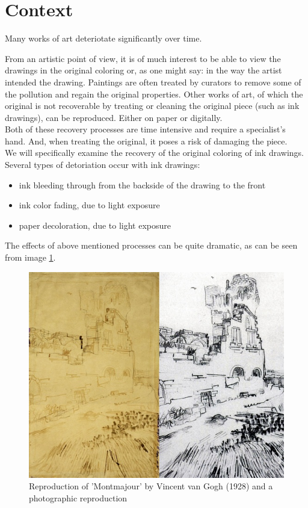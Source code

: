 \section{Context}

	Many works of art deteriotate significantly over time.

	From an artistic point of view, it is of much interest to be able to view the drawings
	in the original coloring or, as one might say: in the way the artist intended the drawing.
	Paintings are often treated by curators to remove some of the pollution and regain
	the original properties.  Other works of art, of which the original is not recoverable by
	treating or cleaning the original piece (such as ink drawings), can be reproduced.
	Either on paper or digitally. \\

	Both of these recovery processes are time intensive and require a specialist's hand.
	And, when treating the original, it poses a risk of damaging the piece. \\

	We will specifically examine the recovery of the original coloring of ink drawings.
	Several types of detoriation occur with ink drawings:

	\begin{itemize}
		\item ink bleeding through from the backside of the drawing to the front
		\item ink color fading, due to light exposure
		\item paper decoloration, due to light exposure
	\end{itemize}

	The effects of above mentioned processes can be quite dramatic, as can be seen from
	image \ref{montmajour}.

	\begin{figure}[h!]
		\label{montmajour}
		\includegraphics[width=\columnwidth]{graphics/montmajour}
		\caption{Reproduction of 'Montmajour' by Vincent van Gogh (1928) and a photographic reproduction}
	\end{figure}

